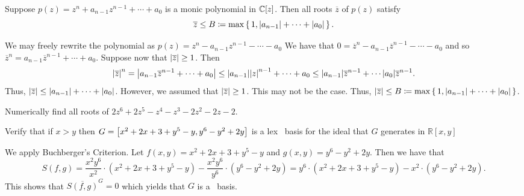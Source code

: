 \documentclass[letterpaper, 11pt, oneside]{book}
\begin{document}
\begin{exercise}\label{ex:UAG_2.1.2}

\end{exercise}

\begin{exercise}\label{ex:UAG_2.1.3}
  Suppose $p(z) = z^{n} + a_{n - 1}z^{n - 1} + \cdots + a_{0}$ is a monic polynomial in $\mathbb{C}[z]$.
  Then all roots $\overline{z}$ of $p(z)$ satisfy
  \[
    \overline{z} \leq B \coloneqq \max\set{1, \abs{a_{n - 1}} + \cdots + \abs{a_{0}}}.
  \]
\end{exercise}
\begin{pf}
  We may freely rewrite the polynomial as $p(z) = z^{n} - a_{n - 1}z^{n - 1} - \cdots - a_{0}$
  We have that $0 = \overline{z}^{n} - a_{n - 1}\overline{z}^{n - 1} - \cdots - a_{0}$ and so $\overline{z}^{n} = a_{n - 1}\overline{z}^{n - 1} + \cdots + a_{0}$.
  Suppose now that $\abs{\overline{z}} \geq 1$.
  Then
  \[
    \abs{\overline{z}}^{n} = \abs{a_{n - 1}\overline{z}^{n - 1} + \cdots + a_{0}} \leq \abs{a_{n - 1}}\abs{z}^{n - 1} + \cdots + a_{0} \leq \abs{a_{n - 1}}\overline{z}^{n - 1} + \cdots \abs{a_{0}}\overline{z}^{n - 1}.
  \]
  Thus, $\abs{\overline{z}} \leq \abs{a_{n - 1}} + \cdots + \abs{a_{0}}$.
  However, we assumed that $\abs{\overline{z}} \geq 1$.
  This may not be the case.
  Thus, $\abs{\overline{z}} \leq B \coloneqq \max\set{1, \abs{a_{n - 1}} + \cdots + \abs{a_{0}}}$.
\end{pf}

\begin{exercise}\label{ex:UAG_2.1.4}
  Numerically find all roots of $2z^{6} + 2z^{5} - z^{4} - z^{3} - 2z^{2} - 2z - 2$.
\end{exercise}

\clearpage

\begin{exercise}\label{ex:UAG_2.1.5}
  Verify that if $x > y$ then $G = \bqty{x^{2} + 2x + 3 + y^{5} - y, y^{6} - y^{2} + 2y}$ is a lex \Grobner\ basis for the ideal that $G$ generates in $\mathbb{R}[x, y]$
\end{exercise}
\begin{pf}
  We apply Buchberger's Criterion.
  Let $f(x, y) = x^{2} + 2x + 3 + y^{5} - y$ and $g(x, y) = y^{6} - y^{2} + 2y$.
  Then we have that
  \[
    S(f, g) = \frac{x^{2}y^{6}}{x^{2}} \cdot (x^{2} + 2x + 3 + y^{5} - y) - \frac{x^{2}y^{6}}{y^{6}} \cdot (y^{6} - y^{2} + 2y) = y^{6} \cdot (x^{2} + 2x + 3 + y^{5} - y) - x^{2} \cdot (y^{6} - y^{2} + 2y).
  \]
  This shows that $\overline{S(f, g)}^{G} = 0$ which yields that $G$ is a \Grobner\ basis.
\end{pf}
\end{document}
